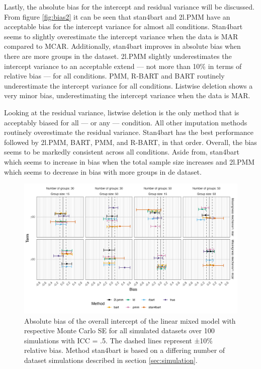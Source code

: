 \documentclass[preprint,12pt]{elsarticle}
\begin{document}

Lastly, the absolute bias for the intercept and residual variance will be discussed. From figure \ref{fig:bias2} it can be seen that stan4bart and 2l.PMM have an acceptable bias for the intercept variance for almost all conditions. Stan4bart seems to slightly overestimate the intercept variance when the data is MAR compared to MCAR. Additionally, stan4bart improves in absolute bias when there are more groups in the dataset. 2l.PMM slightly underestimates the intercept variance to an acceptable extend --- not more than 10\% in terms of relative bias --- for all conditions. PMM, R-BART and BART routinely underestimate the intercept variance for all conditions. Listwise deletion shows a very minor bias, underestimating the intercept variance when the data is MAR. 

Looking at the residual variance, listwise deletion is the only method that is acceptably biased for all --- or any --- condition. All other imputation methods routinely overestimate the residual variance. Stan4bart has the best performance followed by 2l.PMM, BART, PMM, and R-BART, in that order. Overall, the bias seems to be markedly consistent across all conditions. Aside from, stan4bart which seems to increase in bias when the total sample size increases and 2l.PMM which seems to decrease in bias with more groups in de dataset. 

\begin{figure}[H]
    \centering
    \includegraphics[width=1\textwidth]{biasintercept.png}
    \caption{Absolute bias of the overall intercept of the linear mixed model with respective Monte Carlo SE for all simulated datasets over 100 simulations with ICC = .5. The dashed lines represent ±10\% relative bias. Method stan4bart is based on a differing number of dataset simulations described in section \ref{sec:simulation}.}
    \label{fig:biasintercept}
\end{figure}
\end{document}
